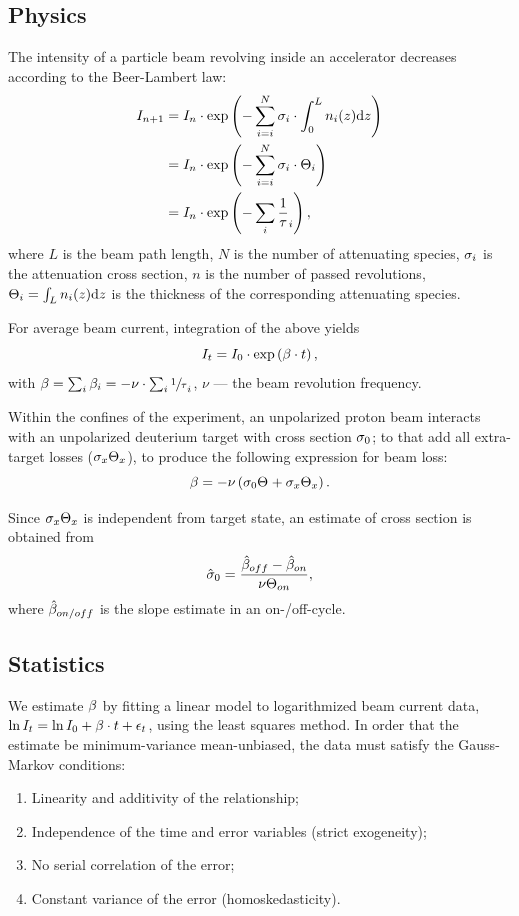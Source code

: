 \documentclass[reprint]{revtex4-1}
\newcommand{\td}{\mathrm{d}}
\begin{document}
\subsection{Physics}
The intensity of a particle beam revolving inside an accelerator decreases according to the Beer-Lambert law:
\begin{align*}
	I_{n+1} &= I_n \cdot \exp\bkt{-\sum_{i=i}^N \CS[i]\cdot\int_0^L n_i(z)\td z} \\
			&= I_n \cdot \exp\bkt{-\sum_{i=i}^N \CS[i]\cdot \Thick[i]} \\
			&= I_n \cdot \exp\bkt{-\sum_i\frac1\tau_i},
\end{align*}
where $L$ is the beam path length, $N$ is the number of attenuating species, $\CS[i]$ is the attenuation cross section, $n$ is the number of passed revolutions, $\Thick[i] = \int_L n_i(z)\td z$ is the thickness of the corresponding attenuating species.

For average beam current, integration of the above yields
\begin{equation}\label{eq:CurrentDecay}
	I_t = I_0 \cdot \exp\bkt{\slp\cdot t},
\end{equation}
with $\slp = \sum_i \slp[i] = - \nu\cdot\sum_i \sfrac1\tau_i$, $\nu$ --- the beam revolution frequency. 

Within the confines of the experiment, an unpolarized proton beam interacts with an unpolarized deuterium target with cross section $\CS[0]$; to that add all extra-target losses ($\CS[x]\Thick[x]$), to produce the following expression for beam loss:
\begin{equation}\label{eq:SlopeModel}
	\slp = -\nu\bkt{\CS[0]\Thick + \CS[x]\Thick[x]}.
\end{equation}

Since $\CS[x]\Thick[x]$ is independent from target state, an estimate of cross section is obtained from  
\begin{equation}
	\CS*[0] = \frac{\slp*[off] - \slp*[on]}{\nu\Thick[on]},
\end{equation}
where $\slp*[on/off]$ is the slope estimate in an on-/off-cycle.

\subsection{Statistics}

We estimate $\slp$ by fitting a linear model to logarithmized beam current data, $\ln I_t = \ln I_0 + \slp\cdot t + \epsilon_t$, using the least squares method. In order that the estimate be minimum-variance mean-unbiased, the data must satisfy the Gauss-Markov conditions:~\cite{GaussMarkov}
\begin{enumerate}
	\item Linearity and additivity of the relationship;
	\item Independence of the time and error variables (strict exogeneity);
	\item No serial correlation of the error;
	\item Constant variance of the error (homoskedasticity).
\end{enumerate}
\end{document}

